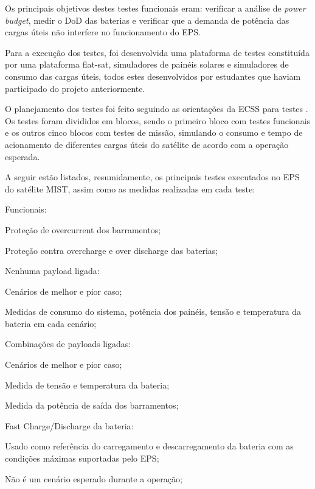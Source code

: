 Os principais objetivos destes testes funcionais eram: verificar a análise de \textit{power budget}, medir o \gls{DoD} das baterias e verificar que a demanda de potência das cargas úteis não interfere no funcionamento do \gls{EPS}.

Para a execução dos testes, foi desenvolvida uma plataforma de testes constituída por uma plataforma flat-sat, simuladores de painéis solares e simuladores de consumo das cargas úteis, todos estes desenvolvidos por estudantes que haviam participado do projeto anteriormente.

O planejamento dos testes foi feito seguindo as orientações da \gls{ECSS} para testes \cite{ecss-e-st-10-03}.
Os testes foram divididos em blocos, sendo o primeiro bloco com testes funcionais e os outros cinco blocos com testes de missão, simulando o consumo e tempo de acionamento de diferentes cargas úteis do satélite de acordo com a operação esperada.

A seguir estão listados, resumidamente, os principais testes executados no \gls{EPS} do satélite MIST, assim como as medidas realizadas em cada teste:

\begin{alineas}
    \item Funcionais:
    \begin{alineas}
        \item Proteção de overcurrent dos barramentos;
        \item Proteção contra overcharge e over discharge das baterias;
    \end{alineas}
    \item Nenhuma payload ligada:
    \begin{alineas}
        \item Cenários de melhor e pior caso;
        \item Medidas de consumo do sistema, potência dos painéis, tensão e temperatura da bateria em cada cenário;
    \end{alineas}
    \item Combinações de payloads ligadas:
    \begin{alineas}
        \item Cenários de melhor e pior caso;
        \item Medida de tensão e temperatura da bateria;
        \item Medida da potência de saída dos barramentos;
    \end{alineas}
    \item Fast Charge/Discharge da bateria:
    \begin{alineas}
        \item Usado como referência do carregamento e descarregamento da bateria com as condições máximas suportadas pelo EPS;
        \item Não é um cenário esperado durante a operação;
    \end{alineas}
\end{alineas}



